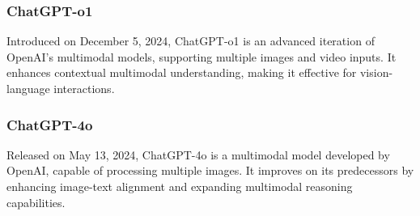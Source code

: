 \subsubsection{ChatGPT-o1} 
Introduced on December 5, 2024, ChatGPT-o1 \cite{chatgpt} is an advanced iteration of OpenAI’s multimodal models, supporting multiple images and video inputs. It enhances contextual multimodal understanding, making it effective for vision-language interactions.

\subsubsection{ChatGPT-4o} 
Released on May 13, 2024, ChatGPT-4o \cite{chatgpt} is a multimodal model developed by OpenAI, capable of processing multiple images. It improves on its predecessors by enhancing image-text alignment and expanding multimodal reasoning capabilities.


